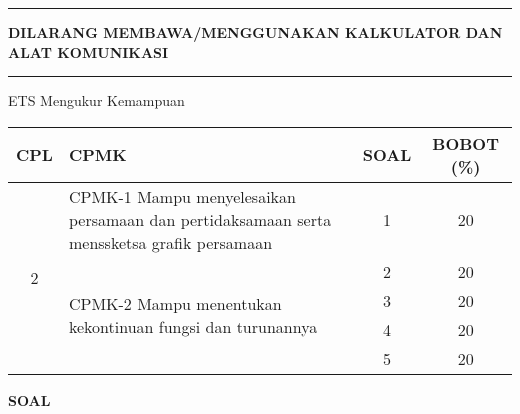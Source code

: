 \documentclass[11pt,openany,a4paper]{article}
\begin{document}
\noindent\rule{\textwidth}{2.pt}

\setlength{\parindent}{5pt}
\setlength{\parindent}{5pt}
\setlength{\parindent}{5pt}
\par \textbf{\small\MakeUppercase{dilarang membawa/menggunakan kalkulator dan alat komunikasi}}
\par {}
\noindent\rule{\textwidth}{2.pt}

\begin{table}[h]
    \centering
    ETS Mengukur Kemampuan
    \begin{tabular}{|c|m{11cm}|c|c|}
        \hline
        CPL & CPMK                                                                                      & SOAL & BOBOT (\%) \\ \hline
        \multirow{5}{*}{2}
            & CPMK-1 Mampu menyelesaikan persamaan dan pertidaksamaan serta menssketsa grafik persamaan & 1    & 20         \\ \cline{2-4}
            & \multirow{4}{*}{CPMK-2 Mampu menentukan kekontinuan fungsi dan turunannya}                & 2    & 20         \\\cline{3-4}
            &                                                                                           & 3    & 20         \\ \cline{3-4}
            &                                                                                           & 4    & 20         \\ \cline{3-4}
            &                                                                                           & 5    & 20         \\ \hline
    \end{tabular}
\end{table}
{\centering\textbf{SOAL}}
\end{document}

